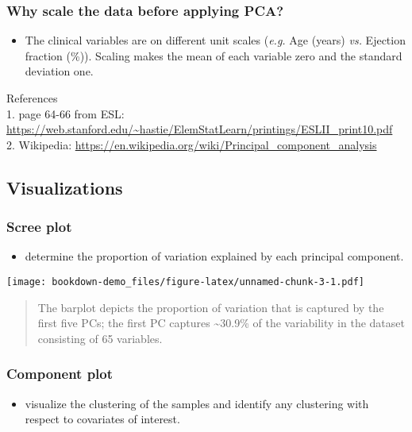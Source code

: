 \documentclass[]{book}
\providecommand{\tightlist}{%
  \setlength{\itemsep}{0pt}\setlength{\parskip}{0pt}}
\begin{document}
\subsubsection{Why scale the data before applying
PCA?}\label{why-scale-the-data-before-applying-pca}

\begin{itemize}
\tightlist
\item
  The clinical variables are on different unit scales (\emph{e.g.} Age
  (years) \emph{vs.} Ejection fraction (\%)). Scaling makes the mean of
  each variable zero and the standard deviation one.
\end{itemize}

References\\
1. page 64-66 from ESL:
\url{https://web.stanford.edu/~hastie/ElemStatLearn/printings/ESLII_print10.pdf}\\
2. Wikipedia:
\url{https://en.wikipedia.org/wiki/Principal_component_analysis}

\subsection{Visualizations}\label{visualizations}

\subsubsection{Scree plot}\label{scree-plot}

\begin{itemize}
\tightlist
\item
  determine the proportion of variation explained by each principal
  component.
\end{itemize}

\texttt{[image: bookdown-demo\_files/figure-latex/unnamed-chunk-3-1.pdf]}

\begin{quote}
The barplot depicts the proportion of variation that is captured by the
first five PCs; the first PC captures \textasciitilde{}30.9\% of the
variability in the dataset consisting of 65 variables.
\end{quote}

\subsubsection{Component plot}\label{component-plot}

\begin{itemize}
\tightlist
\item
  visualize the clustering of the samples and identify any clustering
  with respect to covariates of interest.
\end{itemize}
\end{document}
